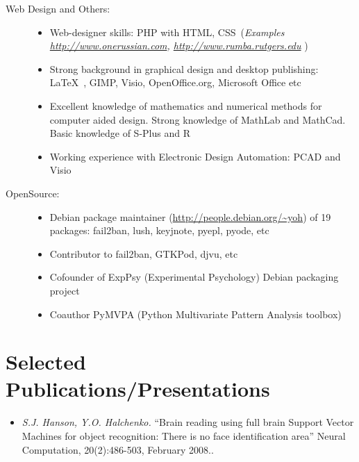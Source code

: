 \documentclass[10pt,overlapped,line]{res}
\newcommand{\wdescription}[1]{({\small \textit{#1}})}
\newcommand{\mtitle}[1]{``#1''}
\newcommand{\mauthors}[1]{ \textit{#1.}}
\newcommand{\mwhere}[1]{#1.}
\begin{document}
\begin{resume}
\begin{description}
    \item[Web Design and Others:]  \hspace*{\fill}
      \begin{itemize}
      \item Web-designer skills: PHP with HTML, CSS\ 
        \wdescription{Examples
          \url{http://www.onerussian.com},
          \url{http://www.rumba.rutgers.edu}
}
      \item Strong background in graphical design and desktop
        publishing: \LaTeX\ , GIMP, Visio, OpenOffice.org, Microsoft Office etc

      \item Excellent knowledge of mathematics and numerical methods
        for computer aided design. Strong knowledge of MathLab and
        MathCad. Basic knowledge of S-Plus and R

      \item Working experience with Electronic Design Automation: PCAD and
        Visio
      \end{itemize}

   \item[{O}pen{S}ource:]\hspace*{\fill}
      \begin{itemize}
      \item Debian package maintainer
        (\url{http://people.debian.org/~yoh}) of 19 packages: fail2ban,
        lush, keyjnote, pyepl, pyode, etc

      \item Contributor to fail2ban, GTKPod, djvu, etc

      \item Cofounder of ExpPsy (Experimental Psychology) Debian
        packaging project

      \item Coauthor PyMVPA (Python Multivariate Pattern Analysis
        toolbox)
    \end{itemize}
  \end{description}

 \section{Selected Publications/Presentations}

 \begin{itemize}

  \item
    \mauthors{S.J. Hanson, Y.O. Halchenko}
    \mtitle{Brain reading using full brain Support Vector Machines for
      object recognition: There is no face identification area}
    \mwhere{Neural Computation, 20(2):486-503, February 2008.}


\end{itemize}
\end{resume}
\end{document}
